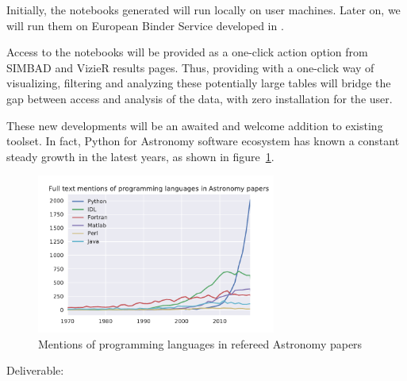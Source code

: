 \begin{task}[
  title=Astronomy application,
  id=astro,
  lead=CDS,
  PM=18,
  wphases={0-48},
  partners={CDS}
]
  Initially, the notebooks generated will run locally on user machines.
  Later on, we will run them on European Binder Service developed in .

  Access to the notebooks will be provided as a one-click action option from
  SIMBAD and VizieR results pages.
  Thus, providing with a one-click way of visualizing, filtering and analyzing
these potentially large tables will bridge the gap between access and analysis
of the data, with zero installation for the user.

  These new developments will be an awaited and welcome addition to existing
  toolset. In fact, Python for Astronomy software ecosystem has known a constant
    steady growth in the latest years, as shown in figure~\ref{fig:python-astro-citations}.

  \begin{figure}[ht]\centering
  \includegraphics[width=0.7\textwidth]{python-astro-citations}
  \caption{Mentions of programming languages in refereed Astronomy papers}\label{fig:python-astro-citations}
\end{figure}

  Deliverable: 

\end{task}

